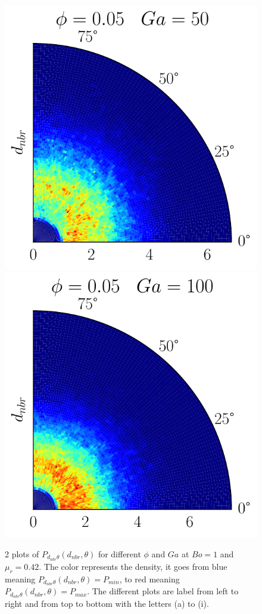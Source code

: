 \begin{figure}[h!]
    \includegraphics[height =\size]{image/N_10/beta/2DMAP_theta_distmin_dmin_10_Bo1PHI0_05mu_r0_042Ga50.pdf}
    \includegraphics[height =\size]{image/N_10/beta/2DMAP_theta_distmin_dmin_10_Bo1PHI0_05mu_r0_042Ga100.pdf}
    \caption{2 plots of $P_{d_{nbr}\theta}(d_{nbr},\theta)$ for different $\phi$ and $Ga$ at $Bo = 1$ and $\mu_r = 0.42$. The color represents the density, it goes from blue meaning $P_{d_{nbr}\theta}(d_{nbr},\theta)= P_{min}$, to red meaning $P_{d_{nbr}\theta}(d_{nbr},\theta) = P_{max}$. The different plots are label from left to right and from top to bottom with the letters (a) to (i).} 
\end{figure} 

